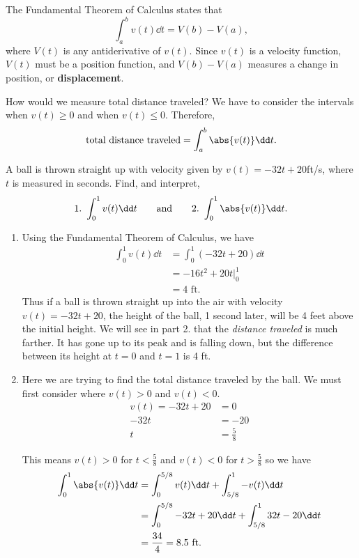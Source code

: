 The Fundamental Theorem of Calculus states that
\[\int_a^b v(t)\dd t = V(b) - V(a),\]
where $V(t)$ is any antiderivative of $v(t)$. Since $v(t)$ is a velocity function, $V(t)$ must be a position function, and $V(b) - V(a)$ measures a change in position, or \textbf{displacement}.

How would we measure total distance traveled? We have to consider the intervals when $v(t)\geq 0$ and when $v(t)\leq 0$. Therefore,
\[\text{total distance traveled}=\int_a^b\abs{v(t)}\dd t.\]\bigskip

\begin{example}\label{ex_ftcmotion1}%
A ball is thrown straight up with velocity given by $v(t) = -32t+20$ft/s, where $t$ is measured in seconds. Find, and interpret,
\[1.\ \int_0^1 v(t)\dd t\qquad\text{and}\qquad 2.\ \int_0^1\abs{v(t)}\dd t.\]
\solution
\begin{enumerate}
\item Using the Fundamental Theorem of Calculus, we have 
\begin{align*}
	\int_0^1 v(t)\dd t &= \int_0^1 (-32t+20)\dd t \\
	&= -16t^2 + 20t\Big|_0^1 \\
	&= 4\text{ ft}.
\end{align*}
Thus if a ball is thrown straight up into the air with velocity $v(t) = -32t+20$, the height of the ball, 1 second later, will be 4 feet above the initial height. We will see in part 2. that the \emph{distance traveled} is much farther. It has gone up to its peak and is falling down, but the difference between its height at $t=0$ and $t=1$ is 4 ft.

\item Here we are trying to find the total distance traveled by the ball. We must first consider where $v(t)>0$ and $v(t)<0$.  
\begin{align*}
v(t)=-32t+20&=0\\
-32t&=-20\\
t&=\frac{5}{8}
\end{align*}

This means $v(t)>0$ for $t<\frac{5}{8}$ and $v(t)<0$ for $t>\frac{5}{8}$ so we have 
\begin{align*}
\int_0^1 \abs{v(t)}\dd t
&=\int_0^{5/8} v(t)\dd t + \int_{5/8}^1 -v(t)\dd t\\
&=\int_0^{5/8} -32t+20\dd t + \int_{5/8}^1 32t-20\dd t\\
&=\frac{34}{4}=8.5 \text{ ft}.
\end{align*}
\end{enumerate}
\end{example}

